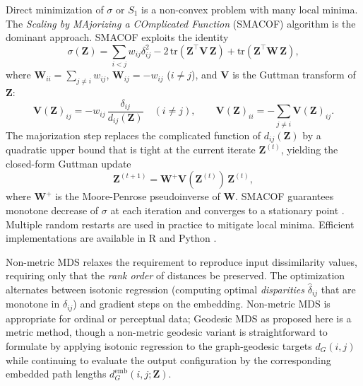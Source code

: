 \documentclass[11pt]{article}
\newcommand{\bZ}{\mathbf{Z}}
\newcommand{\bV}{\mathbf{V}}
\newcommand{\bW}{\mathbf{W}}
\newcommand{\demb}{d^{\mathrm{emb}}}
\newcommand{\StressOne}{S_1}
\begin{document}
Direct minimization of $\sigma$ or $\StressOne$ is a non-convex problem
with many local minima.  The \emph{Scaling by MAjorizing a COmplicated
Function} (SMACOF) algorithm \citep{deleeuw1977applications,
deleeuw2009multidimensional} is the dominant approach.  SMACOF exploits
the identity
\begin{equation}
  \sigma(\bZ) = \sum_{i<j}w_{ij}\delta_{ij}^2
               - 2\,\mathrm{tr}(\bZ^\top \bV\,\bZ)
               + \mathrm{tr}(\bZ^\top \bW\,\bZ),
  \label{eq:smacof_decomp}
\end{equation}
where $\bW_{ii} = \sum_{j \neq i} w_{ij}$, $\bW_{ij} = -w_{ij}$ ($i \neq
j$), and $\bV$ is the Guttman transform of $\bZ$:
\begin{equation}
  \bV(\bZ)_{ij} = -w_{ij}\,\frac{\delta_{ij}}{d_{ij}(\bZ)}\quad(i \neq j),
  \qquad
  \bV(\bZ)_{ii} = -\sum_{j \neq i} \bV(\bZ)_{ij}.
  \label{eq:guttman}
\end{equation}
The majorization step replaces the complicated function of $d_{ij}(\bZ)$
by a quadratic upper bound that is tight at the current iterate $\bZ^{(t)}$,
yielding the closed-form Guttman update
\begin{equation}
  \bZ^{(t+1)} = \bW^+ \bV(\bZ^{(t)})\,\bZ^{(t)},
  \label{eq:guttman_update}
\end{equation}
where $\bW^+$ is the Moore-Penrose pseudoinverse of $\bW$.  SMACOF
guarantees monotone decrease of $\sigma$ at each iteration and converges
to a stationary point \citep{deleeuw2009multidimensional}.  Multiple random
restarts are used in practice to mitigate local minima.  Efficient
implementations are available in R \citep{deleeuw2009multidimensional}
and Python \citep{pedregosa2011scikit}.

Non-metric MDS \citep{kruskal1964nonmetric, shepard1962analysis} relaxes
the requirement to reproduce input dissimilarity values, requiring only
that the \emph{rank order} of distances be preserved.  The optimization
alternates between isotonic regression (computing optimal
\emph{disparities} $\hat\delta_{ij}$ that are monotone in $\delta_{ij}$)
and gradient steps on the embedding.  Non-metric MDS is appropriate for
ordinal or perceptual data; Geodesic MDS as proposed here is a metric
method, though a non-metric geodesic variant is straightforward to
formulate by applying isotonic regression to the graph-geodesic targets
$d_G(i,j)$ while continuing to evaluate the output configuration by the
corresponding embedded path lengths $\demb_G(i,j;\bZ)$.
\end{document}
